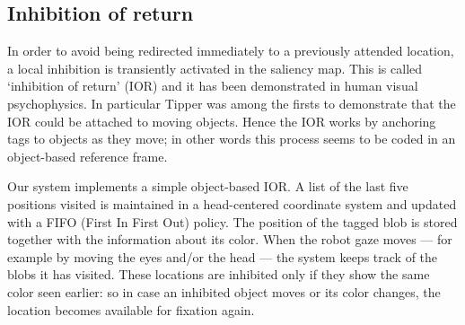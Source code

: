 \documentclass{llncs}
\begin{document}
\subsection{Inhibition of return}
In order to avoid being redirected immediately to a
previously attended location, a local inhibition is
transiently activated in the saliency map. This is called
`inhibition of return' (IOR) and it has been
demonstrated in human visual psychophysics.
In particular Tipper \cite{Tipper91} was among the firsts to
demonstrate that the IOR could be attached to moving objects.
Hence the IOR works by anchoring tags to
objects as they move; in other words this process seems
to be coded in an object-based reference frame.

Our system implements a simple object-based IOR.
A list of the last five positions visited is
maintained in a head-centered coordinate system and
updated with a FIFO (First In First Out) policy. The
position of the tagged blob is stored together with the
information about its color. When the robot gaze
moves --- for example by moving the eyes and/or the
head --- the system keeps track of the blobs it has
visited. These locations are inhibited only if they show
the same color seen earlier: so in case an inhibited
object moves or its color changes, the location
becomes available for fixation again.

\end{document}
